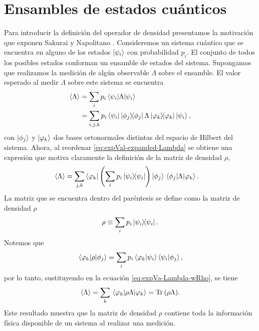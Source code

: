 \section{Ensambles de estados cuánticos} \label{sec:ensambles} %

Para introducir la definición del operador de densidad presentamos la 
motivación que exponen Sakurai y Napolitano \cite{sakurai_napolitano_2017}.
Consideremos un sistema cuántico que se encuentra en alguno de los estados 
$\ket{\psi_{i} }$ con probabilidad $p_i$. El conjunto de todos los posibles estados
conforman un ensamble de estados del sistema. Supongamos que realizamos 
la medición de algún observable $\Lambda$ sobre el ensamble. El 
valor esperado al medir $\Lambda$ sobre este sistema se encuentra
\begin{align}\label{eq:expVal-expanded-Lambda}
	\expval{\Lambda} &= \sum_i p_i \matrixel{\psii}{\Lambda}{\psii}\nonumber\\
	&= \sum_{i,j,k} p_i 
	\bra{\psii}\dyad{\phi_j}{\phi_j}\Lambda\dyad{\varphi_k}{\varphi_k}\Pk{i},
\end{align}
con $\ket{\phi_j}$ y $\ket{\varphi_k}$ dos bases ortonormales distintas del
espacio de Hilbert del sistema. Ahora, al reordenar 
\eqref{eq:expVal-expanded-Lambda} se obtiene una expresión 
que motiva claramente la definición de la matriz de densidad $\rho$,
\begin{align}\label{eq:expVa-Lambda-wRho}
	\expval{\Lambda}&= \sum _{j,k}\bra{\varphi_k}\qty(\sum_ip_i \dyad{\psii}{\psii} 
	)\ket{\phi_j}	\matrixel{\phi_j}{\Lambda}{\varphi_k}.
\end{align}
La matriz que se encuentra dentro del paréntesis se define como 
la matriz de densidad 
$\rho$~\cite{nielsen_chuang_2011, sakurai_napolitano_2017}
\begin{equation}
	\rho \equiv \sum _i p_i\dyad{\psi_i}{\psi_i}.
	\label{eq:rho_def}
\end{equation}
Notemos que 
\begin{align}
	\matrixel{\varphi_k}{\rho}{\phi_j} = 
	\sum_ip_i \braket{\varphi_k}{\psii}\braket{\psii}{\phi_j},
\end{align}
por lo tanto, sustituyendo en la ecuación \eqref{eq:expVa-Lambda-wRho},
se tiene
\begin{align}\label{eq:Tr(rhoLambda)}
	\expval{\Lambda}=\sum _k \matrixel{\varphi_k}{\rho \Lambda}{\varphi_k} 
	= \Tr \qty(\rho\Lambda).
\end{align} 
Este resultado muestra que la matriz de densidad $\rho$ 
contiene toda la información física disponible de un sistema al 
realizar una medición.

